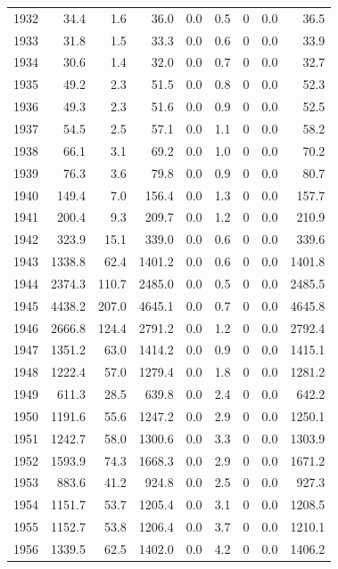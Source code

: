 \documentclass[12pt,]{article}
\begin{document}
\begin{longtable}{rrrrrrrrr}
  1932 & 34.4 & 1.6 & 36.0 & 0.0 & 0.5 & 0 & 0.0 & 36.5 \\ 
  1933 & 31.8 & 1.5 & 33.3 & 0.0 & 0.6 & 0 & 0.0 & 33.9 \\ 
  1934 & 30.6 & 1.4 & 32.0 & 0.0 & 0.7 & 0 & 0.0 & 32.7 \\ 
  1935 & 49.2 & 2.3 & 51.5 & 0.0 & 0.8 & 0 & 0.0 & 52.3 \\ 
  1936 & 49.3 & 2.3 & 51.6 & 0.0 & 0.9 & 0 & 0.0 & 52.5 \\ 
  1937 & 54.5 & 2.5 & 57.1 & 0.0 & 1.1 & 0 & 0.0 & 58.2 \\ 
  1938 & 66.1 & 3.1 & 69.2 & 0.0 & 1.0 & 0 & 0.0 & 70.2 \\ 
  1939 & 76.3 & 3.6 & 79.8 & 0.0 & 0.9 & 0 & 0.0 & 80.7 \\ 
  1940 & 149.4 & 7.0 & 156.4 & 0.0 & 1.3 & 0 & 0.0 & 157.7 \\ 
  1941 & 200.4 & 9.3 & 209.7 & 0.0 & 1.2 & 0 & 0.0 & 210.9 \\ 
  1942 & 323.9 & 15.1 & 339.0 & 0.0 & 0.6 & 0 & 0.0 & 339.6 \\ 
  1943 & 1338.8 & 62.4 & 1401.2 & 0.0 & 0.6 & 0 & 0.0 & 1401.8 \\ 
  1944 & 2374.3 & 110.7 & 2485.0 & 0.0 & 0.5 & 0 & 0.0 & 2485.5 \\ 
  1945 & 4438.2 & 207.0 & 4645.1 & 0.0 & 0.7 & 0 & 0.0 & 4645.8 \\ 
  1946 & 2666.8 & 124.4 & 2791.2 & 0.0 & 1.2 & 0 & 0.0 & 2792.4 \\ 
  1947 & 1351.2 & 63.0 & 1414.2 & 0.0 & 0.9 & 0 & 0.0 & 1415.1 \\ 
  1948 & 1222.4 & 57.0 & 1279.4 & 0.0 & 1.8 & 0 & 0.0 & 1281.2 \\ 
  1949 & 611.3 & 28.5 & 639.8 & 0.0 & 2.4 & 0 & 0.0 & 642.2 \\ 
  1950 & 1191.6 & 55.6 & 1247.2 & 0.0 & 2.9 & 0 & 0.0 & 1250.1 \\ 
  1951 & 1242.7 & 58.0 & 1300.6 & 0.0 & 3.3 & 0 & 0.0 & 1303.9 \\ 
  1952 & 1593.9 & 74.3 & 1668.3 & 0.0 & 2.9 & 0 & 0.0 & 1671.2 \\ 
  1953 & 883.6 & 41.2 & 924.8 & 0.0 & 2.5 & 0 & 0.0 & 927.3 \\ 
  1954 & 1151.7 & 53.7 & 1205.4 & 0.0 & 3.1 & 0 & 0.0 & 1208.5 \\ 
  1955 & 1152.7 & 53.8 & 1206.4 & 0.0 & 3.7 & 0 & 0.0 & 1210.1 \\ 
  1956 & 1339.5 & 62.5 & 1402.0 & 0.0 & 4.2 & 0 & 0.0 & 1406.2 \\ 

\end{longtable}
\end{document}
